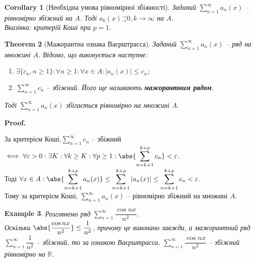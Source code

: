 \documentclass[a4paper, 10pt]{article}
\makeatletter
\def\huge{\displaystyle}
\theoremstyle{theoremdd}
\newtheorem{theorem}{Theorem}[subsection]
\theoremstyle{theoremdd}
\theoremstyle{theoremdd}
\theoremstyle{theoremdd}
\theoremstyle{theoremdd}
\newtheorem{example}[theorem]{Example}
\theoremstyle{theoremdd}
\theoremstyle{theoremdd}
\theoremstyle{theoremdd}
\theoremstyle{theoremdd}
\newtheorem{corollary}[theorem]{Corollary}
\renewenvironment{proof}[1][Proof.\\]{\par
\pushQED{\hfill \qed}%
\normalfont \topsep6\p@\@plus6\p@\relax
\trivlist
\item\relax
{\bfseries
#1\@addpunct{.}}\hspace\labelsep\ignorespaces
}{%
\popQED\endtrivlist\@endpefalse
}
\newcommand{\tounif}{^\rightarrow_\rightarrow}
\makeatother
\begin{document}
\begin{corollary}[Необхідна умова рівномірної збіжності]
Заданий $\huge\sum_{n=1}^\infty a_n(x)$ -- рівномірно збіжний на $A$. Тоді $a_k(x){}\tounif 0, k \to \infty$ на $A$.\\
\textit{Вказівка: критерій Коші при $p = 1$.}
\end{corollary}

\begin{theorem}[Мажорантна ознака Ваєрштрасса]
Заданий $\huge \sum_{n=1}^\infty a_n(x)$ -- ряд на множині $A$. Відомо, що виконується наступне:
\begin{enumerate}[nosep,wide=0pt,label={\arabic*)}]
\item $\exists \{c_n, n \geq 1\}: \forall n \geq 1: \forall x \in A: |a_n(x)| \leq c_n$;\\
\item $\huge \sum_{n=1}^\infty c_n$ -- збіжний. Його ще називають \textbf{мажорантним рядом}.
\end{enumerate}
Тоді $\huge \sum_{n=1}^\infty a_n(x)$ збігається рівномірно на множині $A$.
\end{theorem}

\begin{proof}
За критерієм Коші,$\huge \sum_{n=1}^\infty c_n$ -- збіжний $\iff \forall \varepsilon > 0: \exists K: \forall k \geq K: \forall p \geq 1: \huge \abs{\sum_{n=k+1}^{k+p} c_n} < \varepsilon$. \\
Тоді $\forall x \in A: \huge\abs{\sum_{n=k+1}^{k+p} a_n(x)} \leq \sum_{n=k+1}^{k+p} |a_n(x)| \leq \sum_{n=k+1}^{k+p} c_n < \varepsilon$.\\
Тому за критерієм Коші, $\huge \sum_{n=1}^\infty a_n(x)$ -- рівномірно збіжний на множині $A$.
\end{proof}

\begin{example}
Розглянемо ряд $\huge\sum_{n=1}^\infty \dfrac{\cos nx}{n^2}$.\\
Оскільки $\abs{\dfrac{\cos nx}{n^2}} \leq \dfrac{1}{n^2}$, причому це виконано завжди, а мажорантний ряд $\huge\sum_{n=1}^\infty \dfrac{1}{n^2}$ -- збіжний, то за ознакою Ваєрштрасса, $\huge\sum_{n=1}^\infty \dfrac{\cos nx}{n^2}$ -- збіжний рівномірно на $\mathbb{R}$.
\end{example}
\end{document}
